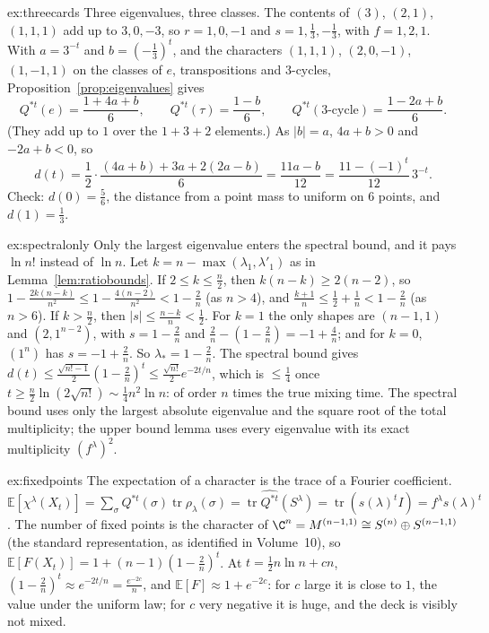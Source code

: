 \begin{solution}{ex:threecards}
\idea Three eigenvalues, three classes.
\writeup The contents of $(3)$, $(2,1)$, $(1,1,1)$ add up to $3,0,-3$, so $r=1,0,-1$ and $s=1,\frac13,-\frac13$, with $f=1,2,1$. With $a=3^{-t}$ and $b=(-\frac13)^t$, and the characters $(1,1,1)$, $(2,0,-1)$, $(1,-1,1)$ on the classes of $e$, transpositions and $3$-cycles, Proposition~\ref{prop:eigenvalues} gives
\[
Q^{*t}(e)=\frac{1+4a+b}6,\qquad Q^{*t}(\tau)=\frac{1-b}6,\qquad Q^{*t}(\text{3-cycle})=\frac{1-2a+b}6.
\]
(They add up to $1$ over the $1+3+2$ elements.) As $|b|=a$, $4a+b>0$ and $-2a+b<0$, so
\[
d(t)=\frac12\cdot\frac{(4a+b)+3a+2(2a-b)}6=\frac{11a-b}{12}=\frac{11-(-1)^t}{12}\,3^{-t}.
\]
Check: $d(0)=\frac56$, the distance from a point mass to uniform on $6$ points, and $d(1)=\frac13$.
\end{solution}

\begin{solution}{ex:spectralonly}
\idea Only the largest eigenvalue enters the spectral bound, and it pays $\ln n!$ instead of $\ln n$.
\writeup Let $k=n-\max(\lambda_1,\lambda'_1)$ as in Lemma~\ref{lem:ratiobounds}. If $2\le k\le\frac n2$, then $k(n-k)\ge2(n-2)$, so $1-\frac{2k(n-k)}{n^2}\le1-\frac{4(n-2)}{n^2}<1-\frac2n$ (as $n>4$), and $\frac{k+1}n\le\frac12+\frac1n<1-\frac2n$ (as $n>6$). If $k>\frac n2$, then $|s|\le\frac{n-k}n<\frac12$. For $k=1$ the only shapes are $(n-1,1)$ and $(2,1^{n-2})$, with $s=1-\frac2n$ and
$\frac2n-(1-\frac2n)=-1+\frac4n$; and for $k=0$, $(1^n)$ has $s=-1+\frac2n$. So $\lambda_*=1-\frac2n$. The spectral bound gives $d(t)\le\frac{\sqrt{n!-1}}2(1-\frac2n)^t\le\frac{\sqrt{n!}}2e^{-2t/n}$, which is $\le\frac14$ once $t\ge\frac n2\ln(2\sqrt{n!})\sim\frac14n^2\ln n$: of order $n$ times the true mixing time.
The spectral bound uses only the largest absolute eigenvalue and the square root of the total multiplicity; the upper bound lemma uses every eigenvalue with its exact multiplicity $(f^\lambda)^2$.
\end{solution}

\begin{solution}{ex:fixedpoints}
\idea The expectation of a character is the trace of a Fourier coefficient.
\writeup $\mathbb E[\chi^\lambda(X_t)]=\sum_\sigma Q^{*t}(\sigma)\operatorname{tr}\rho_\lambda(\sigma)=\operatorname{tr}\widehat{Q^{*t}}(S^\lambda)=\operatorname{tr}(s(\lambda)^tI)=f^\lambda s(\lambda)^t$. The number of fixed points is the character of $\C^n=M^{(n-1,1)}\cong S^{(n)}\oplus S^{(n-1,1)}$ (the standard representation, as identified in Volume~10), so
$\mathbb E[F(X_t)]=1+(n-1)(1-\frac2n)^t$. At $t=\frac12n\ln n+cn$, $(1-\frac2n)^t\approx e^{-2t/n}=\frac{e^{-2c}}n$, and $\mathbb E[F]\approx1+e^{-2c}$: for $c$ large it is close to $1$, the value under the uniform law; for $c$ very negative it is huge, and the deck is visibly not mixed.
\end{solution}

